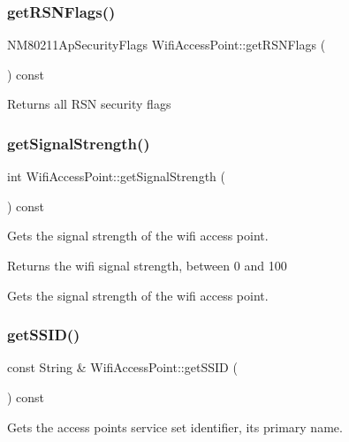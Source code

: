 \subsubsection{\texorpdfstring{get\+R\+S\+N\+Flags()}{getRSNFlags()}}
{\footnotesize\ttfamily N\+M80211\+Ap\+Security\+Flags Wifi\+Access\+Point\+::get\+R\+S\+N\+Flags (\begin{DoxyParamCaption}{ }\end{DoxyParamCaption}) const}

\begin{DoxyReturn}{Returns}
all R\+SN security flags 
\end{DoxyReturn}
\mbox{\label{classWifiAccessPoint_afa3755f10d1a944484e573b40359f1f6}} 
\subsubsection{\texorpdfstring{get\+Signal\+Strength()}{getSignalStrength()}}
{\footnotesize\ttfamily int Wifi\+Access\+Point\+::get\+Signal\+Strength (\begin{DoxyParamCaption}{ }\end{DoxyParamCaption}) const}

Gets the signal strength of the wifi access point.

\begin{DoxyReturn}{Returns}
the wifi signal strength, between 0 and 100
\end{DoxyReturn}
Gets the signal strength of the wifi access point. \mbox{\label{classWifiAccessPoint_a5562a8b3c2300307b9ff709c9b689304}} 
\subsubsection{\texorpdfstring{get\+S\+S\+I\+D()}{getSSID()}}
{\footnotesize\ttfamily const String \& Wifi\+Access\+Point\+::get\+S\+S\+ID (\begin{DoxyParamCaption}{ }\end{DoxyParamCaption}) const}

Gets the access point\textquotesingle{}s service set identifier, its primary name.

